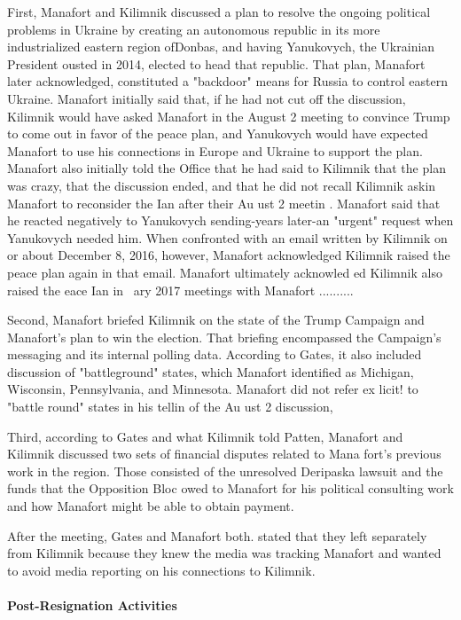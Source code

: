 First, Manafort and Kilimnik discussed a plan to resolve the ongoing political problems in Ukraine by creating an autonomous republic in its more industrialized eastern region ofDonbas,%
and having Yanukovych, the Ukrainian President ousted in 2014, elected to head that republic.%
That plan, Manafort later acknowledged, constituted a "backdoor" means for Russia to control eastern Ukraine.%
Manafort initially said that, if he had not cut off the discussion, Kilimnik would have asked Manafort in the August 2 meeting to convince Trump to come out in favor of the peace plan, and Yanukovych would have expected Manafort to use his connections in Europe and Ukraine to support the plan.%
Manafort also initially told the Office that he had said to Kilimnik that the plan was crazy, that the discussion ended, and that he did not recall Kilimnik askin Manafort to reconsider the Ian after their Au ust 2 meetin .%
Manafort said that he reacted negatively to Yanukovych sending-years later-an "urgent" request when Yanukovych needed him.%
When confronted with an email written by Kilimnik on or about December 8, 2016, however, Manafort acknowledged Kilimnik raised the peace plan again in that email.%
Manafort ultimately acknowled ed Kilimnik also raised the eace Ian in ~ary 2017 meetings with Manafort ..........%

Second, Manafort briefed Kilimnik on the state of the Trump Campaign and Manafort's plan to win the election.%
That briefing encompassed the Campaign's messaging and its internal polling data. According to Gates, it also included discussion of "battleground" states, which Manafort identified as Michigan, Wisconsin, Pennsylvania, and Minnesota.%
Manafort did not refer ex licit! to "battle round" states in his tellin of the Au ust 2 discussion,

Third, according to Gates and what Kilimnik told Patten, Manafort and Kilimnik discussed two sets of financial disputes related to Mana fort's previous work in the region. Those consisted of the unresolved Deripaska lawsuit and the funds that the Opposition Bloc owed to Manafort for his political consulting work and how Manafort might be able to obtain payment.%

After the meeting, Gates and Manafort both. stated that they left separately from Kilimnik because they knew the media was tracking Manafort and wanted to avoid media reporting on his connections to Kilimnik.%

\paragraph{Post-Resignation Activities}

